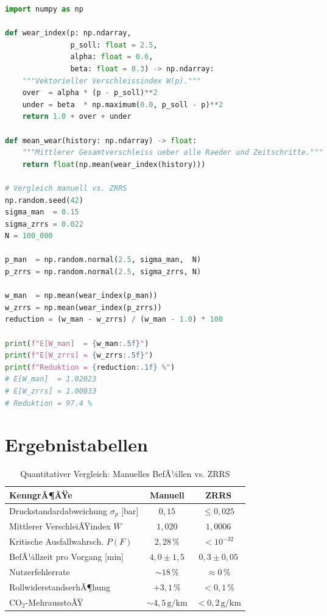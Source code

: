 ﻿\documentclass[a4paper,12pt]{article}
\theoremstyle{definition}
\begin{document}
\begin{lstlisting}[language=Python,
    caption={VerschleiÃŸindex-Berechnung und stochastische Simulation.}]
import numpy as np

def wear_index(p: np.ndarray,
               p_soll: float = 2.5,
               alpha: float = 0.6,
               beta: float = 0.3) -> np.ndarray:
    """Vektorieller Verschleissindex W(p)."""
    over  = alpha * (p - p_soll)**2
    under = beta  * np.maximum(0.0, p_soll - p)**2
    return 1.0 + over + under

def mean_wear(history: np.ndarray) -> float:
    """Mittlerer Gesamtverschleiss ueber alle Raeder und Zeitschritte."""
    return float(np.mean(wear_index(history)))

# Vergleich manuell vs. ZRRS
np.random.seed(42)
sigma_man  = 0.15
sigma_zrrs = 0.022
N = 100_000

p_man  = np.random.normal(2.5, sigma_man,  N)
p_zrrs = np.random.normal(2.5, sigma_zrrs, N)

w_man  = np.mean(wear_index(p_man))
w_zrrs = np.mean(wear_index(p_zrrs))
reduction = (w_man - w_zrrs) / (w_man - 1.0) * 100

print(f"E[W_man]  = {w_man:.5f}")
print(f"E[W_zrrs] = {w_zrrs:.5f}")
print(f"Reduktion = {reduction:.1f} %")
# E[W_man]  = 1.02023
# E[W_zrrs] = 1.00033
# Reduktion = 97.4 %
\end{lstlisting}

\section{Ergebnistabellen}

\begin{table}[H]
\centering
\caption{Quantitativer Vergleich: Manuelles BefÃ¼llen vs. ZRRS}
\label{tab:vergleich}
\begin{tabular}{lcc}
\toprule
\textbf{KenngrÃ¶ÃŸe} & \textbf{Manuell} & \textbf{ZRRS} \\
\midrule
Druckstandardabweichung $\sigma_p$ [bar] & $0{,}15$ & $\leq 0{,}025$ \\
Mittlerer VerschleiÃŸindex $\overline{W}$ & $1{,}020$ & $1{,}0006$ \\
Kritische Ausfallwahrsch. $P(F)$ & $2{,}28\,\%$ & $< 10^{-32}$ \\
BefÃ¼llzeit pro Vorgang [min] & $4{,}0 \pm 1{,}5$ & $0{,}3 \pm 0{,}05$ \\
Nutzerfehlerrate & $\sim 18\,\%$ & $\approx 0\,\%$ \\
RollwiderstandserhÃ¶hung & $+3{,}1\,\%$ & $< 0{,}1\,\%$ \\
CO$_2$-MehrausstoÃŸ & $\sim 4{,}5\,\text{g/km}$ & $< 0{,}2\,\text{g/km}$ \\
\bottomrule
\end{tabular}
\end{table}
\end{document}

